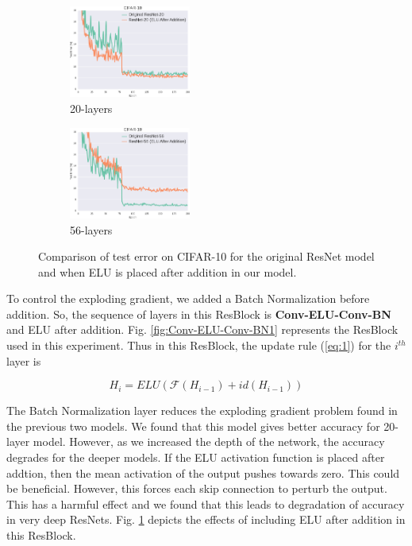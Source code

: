 \documentclass[10pt,twocolumn,letterpaper]{article}
\begin{document}
\begin{figure}
    \centering
    \begin{subfigure}{.23\textwidth}
        \centering
        \includegraphics[width=4cm]{ELU_After_Add_20}
        \caption{20-layers}
    \end{subfigure}
    \begin{subfigure}{.23\textwidth}
        \centering
        \includegraphics[width=4cm]{ELU_After_Add_56}
        \caption{56-layers}
    \end{subfigure}
    \caption{Comparison of test error on CIFAR-10 for the original ResNet model and when ELU is placed after addition in our model.}
    \label{fig:ELU_After_Add}
\end{figure}

To control the exploding gradient, we added a Batch Normalization before addition. So, the sequence of layers in this ResBlock is \textbf{Conv-ELU-Conv-BN} and ELU after addition. Fig. \ref{fig:Conv-ELU-Conv-BN1} represents the ResBlock used in this experiment. Thus in this ResBlock, the update rule (\ref{eq:1}) for the \(i^{th}\) layer is 

\begin{equation} \label{eq:elu_after_add}
 H_i = ELU( \mathcal{F}(H_{i-1}) + id(H_{i-1} ))
\end{equation}

The Batch Normalization layer reduces the exploding gradient problem found in the previous two models. We found that this model gives better accuracy for 20-layer model. However, as we increased the depth of the network, the accuracy degrades for the deeper models. If the ELU activation function is placed after addtion, then the mean activation of the output pushes towards zero. This could be beneficial. However, this forces each skip connection to perturb the output. This has a harmful effect and we found that this leads to degradation of accuracy in very deep ResNets. Fig. \ref{fig:ELU_After_Add} depicts the effects of including ELU after addition in this ResBlock.
\end{document}
